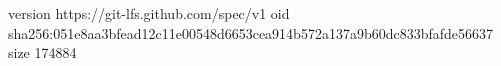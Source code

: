 version https://git-lfs.github.com/spec/v1
oid sha256:051e8aa3bfead12c11e00548d6653cea914b572a137a9b60dc833bfafde56637
size 174884
